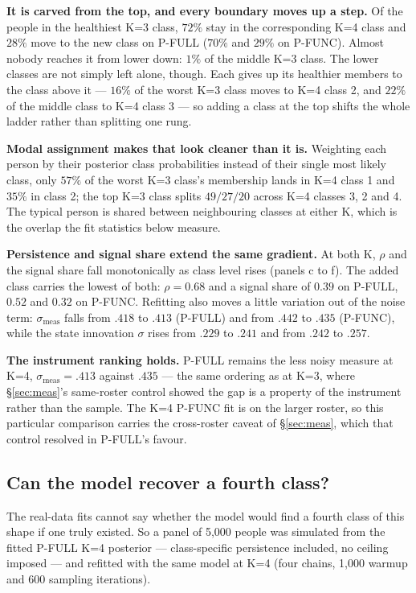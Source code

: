 \documentclass[11pt]{article}
\begin{document}
\textbf{It is carved from the top, and every boundary moves up a step.} Of
the people in the healthiest K=3 class, $72\%$ stay in the corresponding K=4
class and $28\%$ move to the new class on P-FULL ($70\%$ and $29\%$ on
P-FUNC). Almost nobody reaches it from lower down: $1\%$ of the middle K=3
class. The lower classes are not simply left alone, though. Each gives up its
healthier members to the class above it --- $16\%$ of the worst K=3 class
moves to K=4 class 2, and $22\%$ of the middle class to K=4 class 3 --- so
adding a class at the top shifts the whole ladder rather than splitting one
rung.

\textbf{Modal assignment makes that look cleaner than it is.} Weighting each
person by their posterior class probabilities instead of their single most
likely class, only $57\%$ of the worst K=3 class's membership lands in K=4
class 1 and $35\%$ in class 2; the top K=3 class splits $49 / 27 / 20$ across
K=4 classes 3, 2 and 4. The typical person is shared between neighbouring
classes at either K, which is the overlap the fit statistics below measure.

\textbf{Persistence and signal share extend the same gradient.} At both K,
$\rho$ and the signal share fall monotonically as class level rises (panels
c to f). The added class carries the lowest of both: $\rho = 0.68$ and a
signal share of $0.39$ on P-FULL, $0.52$ and $0.32$ on P-FUNC. Refitting
also moves a little variation out of the noise term: $\sigma_{\text{meas}}$
falls from $.418$ to $.413$ (P-FULL) and from $.442$ to $.435$ (P-FUNC),
while the state innovation $\sigma$ rises from $.229$ to $.241$ and from
$.242$ to $.257$.

\textbf{The instrument ranking holds.} P-FULL remains the less noisy measure
at K=4, $\sigma_{\text{meas}} = .413$ against $.435$ --- the same ordering as
at K=3, where \S\ref{sec:meas}'s same-roster control showed the gap is a
property of the instrument rather than the sample. The K=4 P-FUNC fit is on
the larger roster, so this particular comparison carries the cross-roster
caveat of \S\ref{sec:meas}, which that control resolved in P-FULL's favour.

\subsection*{Can the model recover a fourth class?}

The real-data fits cannot say whether the model would find a fourth class of
this shape if one truly existed. So a panel of 5{,}000 people was simulated
from the fitted P-FULL K=4 posterior --- class-specific persistence included,
no ceiling imposed --- and refitted with the same model at K=4 (four chains,
1{,}000 warmup and 600 sampling iterations).
\end{document}
